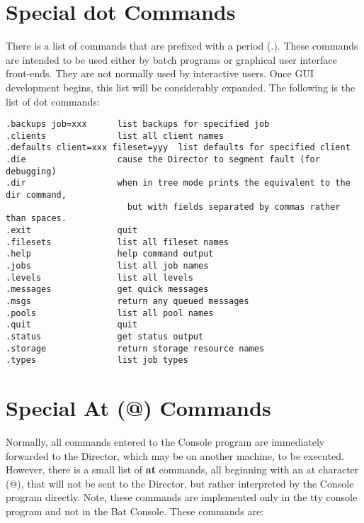 \label{dotcommands}
\section{Special dot Commands}

There is a list of commands that are prefixed with a period (.). These
commands are intended to be used either by batch programs or graphical user
interface front-ends. They are not normally used by interactive users. Once
GUI development begins, this list will be considerably expanded. The following
is the list of dot commands:

\footnotesize
\begin{verbatim}
.backups job=xxx      list backups for specified job
.clients              list all client names
.defaults client=xxx fileset=yyy  list defaults for specified client
.die                  cause the Director to segment fault (for debugging)
.dir                  when in tree mode prints the equivalent to the dir command,
                        but with fields separated by commas rather than spaces.
.exit                 quit
.filesets             list all fileset names
.help                 help command output
.jobs                 list all job names
.levels               list all levels
.messages             get quick messages
.msgs                 return any queued messages
.pools                list all pool names
.quit                 quit
.status               get status output
.storage              return storage resource names
.types                list job types
\end{verbatim}
\normalsize

\label{atcommands}

\section{Special At (@) Commands}

Normally, all commands entered to the Console program are immediately
forwarded to the Director, which may be on another machine, to be executed.
However, there is a small list of {\bf at} commands, all beginning with an at
character (@), that will not be sent to the Director, but rather interpreted
by the Console program directly. Note, these commands are implemented only in
the tty console program and not in the Bat Console. These commands are:

